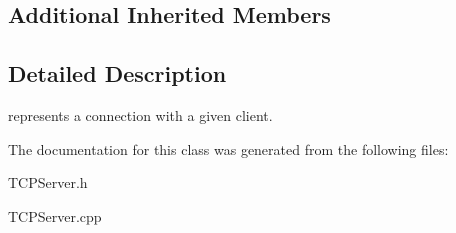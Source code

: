 \subsection*{Additional Inherited Members}


\subsection{Detailed Description}
represents a connection with a given client. 

The documentation for this class was generated from the following files\-:\begin{DoxyCompactItemize}
\item 
T\-C\-P\-Server.\-h\item 
T\-C\-P\-Server.\-cpp\end{DoxyCompactItemize}
